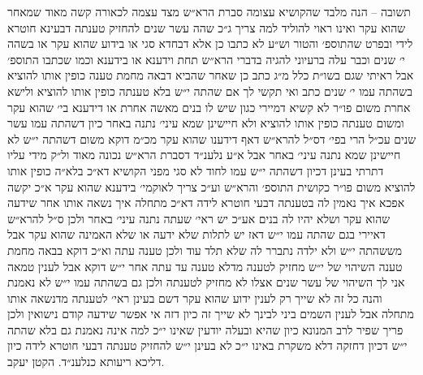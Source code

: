 \documentclass[12pt, openany]{book}
\begin{document}
\begin{multicols}{2}
תשובה – הנה מלבד שהקושיא עצומה סברת הרא״ש מצד עצמה לכאורה קשה מאוד שמאחר שהוא עקר ואינו ראוי להוליד למה צריך ג״כ שהה עשר שנים להחזיק טענתה דבעינא חוטרא לידי ובפרט שהתוספ׳ והטור וש״ע לא כתבו כן אלא דבחדא סגי או בידוע שהוא עקר או בשהה י׳ שנים וכבר עלה ברעיוני להגיה בדברי הרא״ש תחת וידענא או בידענא וכמו שכתבו התוספ׳ אבל ראיתי שגם בשו״ת כלל מ״ג כתב כן שאחר שהביא דבאה מחמת טענה כופין אותו להוציא בשהתה עמו י׳ שנים כתב ואי תקשי לך אם שהתה י״ש בלא טענתה כופין אותו להוציא ולישא אחרת משום פו״ר לא קשיא דמיירי כגון שיש לו בנים מאשה אחרת או דידענא בי׳ שהוא עקר ומשום טענתה כופין אותו להוציא ולא חיישינן שמא עיני׳ נתנה באחר כיון דשהתה עמו עשר שנים עכ״ל הרי בפי׳ דס״ל להרא״ש דאף דידענו שהוא עקר מכ״מ דוקא משום דשהתה י״ש לא חיישינן שמא נתנה עיני׳ באחר אבל א״ע נלענ״ד דסברת הרא״ש נכונה מאוד ול״ק מידי עליו דתרתי בעינן דכיון דשהתה י״ש עמו לחוד לא סגי מפני הקושיא דא״כ בלא״ה כופין אותו להוציא משום פו״ר כקושית התוספ׳ והרא״ש וע״כ צריך לאוקמי׳ בידענא שהוא עקר א״כ יקשה אפכא איך נאמין לה בטענתה דבעי חוטרא לידה דא״כ מתחלה איך נשאה אותו אחר שידעה שהוא עקר ושלא יהיו לה בנים אע״כ יש ראי׳ שעתה נתנה עיני׳ באחר ולכן ס״ל להרא״ש דאיירי בגם שהתה עמו י״ש דאז יש לתלות שלא ידעה או שלא האמינה שהוא עקר אבל מששהתה י״ש ולא ילדה נתברר לה שלא תלד עוד ולכן טענה עתה וא״כ דוקא בבאה מחמת טענה השיהוי של י״ש מחזיק לטענה מדלא טענה עד עתה אחר י״ש דוקא אבל לענין טמאה אני לך השיהוי של עשר שנים אצלו לא מחזיק לטענתה ולכן גם בשהתה עמו י״ש לא נאמנת והנה כל זה לא שייך רק לענין ידוע שהוא עקר דשם בעינן ראי׳ לטענתה מדנשאה אותו מתחלה אבל לענין השמים ביני לבינך לא שייך זה כיון דזה אי אפשר שידעה קודם נישואין ולכן פריך שפיר לרב המנונא כיון שהיא ובעלה יודעין שאינו י״כ למה אינה נאמנת גם בלא שהתה י״ש דכיון דחזקה דלא משקרת באינו י״כ לא בעינן י״ש להחזיק טענתה דבעי חוטרא לידה כיון דליכא ריעותא כנלענ״ד. הקטן יעקב.\\\vspace{0pt}

\end{multicols}\newpage
\end{document}
